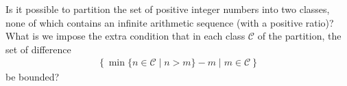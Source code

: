 Is it possible to partition the set of positive integer numbers into two classes, none of which contains an infinite arithmetic sequence (with a positive ratio)? What is we impose the extra condition that in each class $\mathcal{C}$ of the partition, the set of difference
\begin{align*} \left\{ \min \{ n \in \mathcal{C} \mid n >m \} -m \mid m \in \mathcal{C} \right \} \end{align*}be bounded?